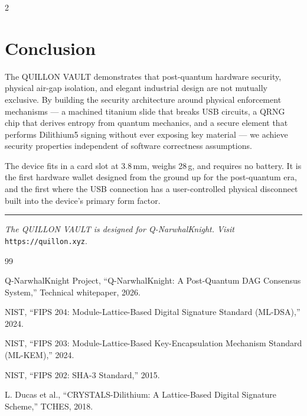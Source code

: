 \documentclass[11pt,a4paper]{article}
\begin{document}
\begin{multicols}{2}
\section{Conclusion}

The QUILLON VAULT demonstrates that post-quantum hardware security,
physical air-gap isolation, and elegant industrial design are not
mutually exclusive. By building the security architecture
around physical enforcement mechanisms --- a machined titanium slide
that breaks USB circuits, a QRNG chip that derives entropy from
quantum mechanics, and a secure element that performs Dilithium5
signing without ever exposing key material --- we achieve security
properties independent of software correctness assumptions.

The device fits in a card slot at 3.8\,mm, weighs 28\,g,
and requires no battery. It is the first hardware wallet designed from
the ground up for the post-quantum era, and the first where the USB
connection has a user-controlled physical disconnect built into the
device's primary form factor.

\vspace{1em}
\noindent\textcolor{qcopper}{\rule{\columnwidth}{0.8pt}}

\vspace{0.5em}
\noindent\small\textit{The QUILLON VAULT is designed for Q-NarwhalKnight.
Visit} \texttt{https://quillon.xyz}.


\begin{thebibliography}{99}

  Q-NarwhalKnight Project,
  ``Q-NarwhalKnight: A Post-Quantum DAG Consensus System,''
  Technical whitepaper, 2026.

  NIST,
  ``FIPS 204: Module-Lattice-Based Digital Signature Standard (ML-DSA),''
  2024.

  NIST,
  ``FIPS 203: Module-Lattice-Based Key-Encapsulation Mechanism Standard (ML-KEM),''
  2024.

  NIST,
  ``FIPS 202: SHA-3 Standard,''
  2015.

  L. Ducas et al.,
  ``CRYSTALS-Dilithium: A Lattice-Based Digital Signature Scheme,''
  TCHES, 2018.


\end{thebibliography}
\end{multicols}
\end{document}
